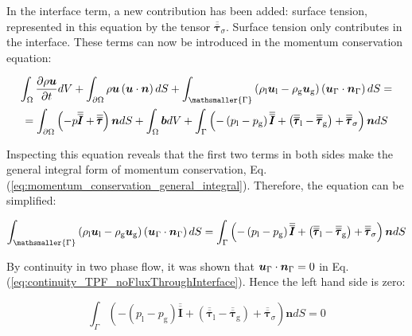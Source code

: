 In the interface term, a new contribution has been added: surface tension, represented in this equation by the tensor $\overline{\overline{\pmb{\tau}}}_\sigma$. Surface tension only contributes in the interface. These terms can now be introduced in the momentum conservation equation:

\begin{multline}
 \int_{\Omega}  \frac{\partial \rho \boldsymbol{u} }{\partial t}  dV + \int_{\partial \Omega} \rho \boldsymbol{u} \left( \boldsymbol{u} \cdot \boldsymbol{n} \right) dS + \int_\mathsmaller{\Gamma} \left( \rho_\mathrm{l} \boldsymbol{u}_\mathrm{l} - \rho_\mathrm{g} \boldsymbol{u}_\mathrm{g} \right) \left( \boldsymbol{u}_{\scriptsize{\Gamma}} \cdot \boldsymbol{n}_{\scriptsize{\Gamma}} \right) dS = \\ = \int_{\partial \Omega} \left( - p \overline{\overline{\pmb{I}}} + \overline{\overline{\pmb{\tau}}} \right) \boldsymbol{n} dS + \int_\Omega \boldsymbol{b} dV + \int_{\Gamma} \left( - \left( p_\mathrm{l} - p_\mathrm{g} \right) \overline{\overline{\pmb{I}}} + \left( \overline{\overline{\pmb{\tau}}}_\mathrm{l} - \overline{\overline{\pmb{\tau}}}_\mathrm{g}  \right) + \overline{\overline{\pmb{\tau}}}_\sigma  \right) \boldsymbol{n} dS
\end{multline}

Inspecting this equation reveals that the first two terms in both sides make the general integral form of momentum conservation, Eq. (\ref{eq:momentum_conservation_general_integral}). Therefore, the equation can be simplified:

\begin{equation}
\int_\mathsmaller{\Gamma} \left( \rho_\mathrm{l} \boldsymbol{u}_\mathrm{l} - \rho_\mathrm{g} \boldsymbol{u}_\mathrm{g} \right) \left( \boldsymbol{u}_{\scriptsize{\Gamma}} \cdot \boldsymbol{n}_{\scriptsize{\Gamma}} \right) dS =  \int_{\Gamma} \left( - \left( p_\mathrm{l} - p_\mathrm{g} \right) \overline{\overline{\pmb{I}}} + \left( \overline{\overline{\pmb{\tau}}}_\mathrm{l} - \overline{\overline{\pmb{\tau}}}_\mathrm{g}  \right) + \overline{\overline{\pmb{\tau}}}_\sigma  \right) \boldsymbol{n} dS
\end{equation}

By continuity in two phase flow, it was shown that $\boldsymbol{u}_{\scriptsize{\Gamma}} \cdot \boldsymbol{n}_{\scriptsize{\Gamma}} = 0$ in Eq.  (\ref{eq:continuity_TPF_noFluxThroughInterface}). Hence the left hand side is zero:

\begin{equation}
\int_{\Gamma} \left( - \left( p_\mathrm{l} - p_\mathrm{g} \right) \overline{\overline{\pmb{I}}} + \left( \overline{\overline{\pmb{\tau}}}_\mathrm{l} - \overline{\overline{\pmb{\tau}}}_\mathrm{g}  \right) + \overline{\overline{\pmb{\tau}}}_\sigma  \right) \boldsymbol{n} dS = 0
\end{equation}


